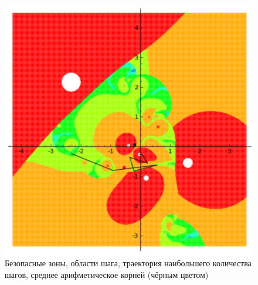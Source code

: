 \documentclass[a4paper,12pt]{article}
\begin{document}
\newpage
\begin{figure}[hbt!]
    \centering
    \includegraphics[width=0.75\linewidth]{images/fig2.png}
    \caption{Безопасные зоны, области шага, траектория наибольшего количества шагов, среднее арифметическое корней (чёрным цветом)}
    \label{fig:enter-label}
\end{figure}
\newpage
\end{document}
